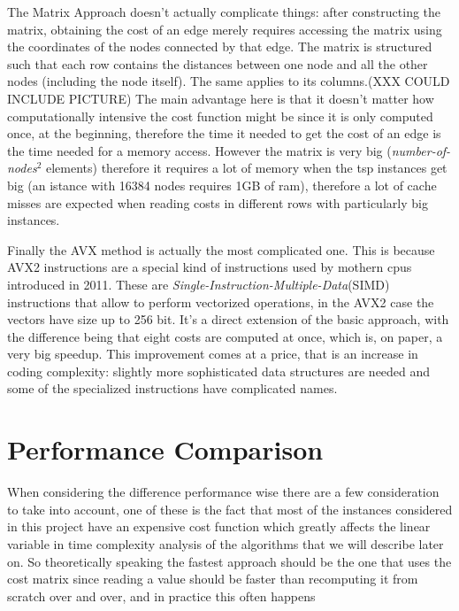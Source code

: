 The Matrix Approach doesn't actually complicate things: after constructing the matrix, obtaining the cost of an edge merely requires accessing the matrix using the coordinates of the nodes connected by that edge. The matrix is structured such that each row contains the distances between one node and all the other nodes (including the node itself). The same applies to its columns.(XXX COULD INCLUDE PICTURE) The main advantage here is that it doesn't matter how computationally intensive the cost function might be since it is only computed once, at the beginning, therefore the time it needed to get the cost of an edge is the time needed for a memory access. However the matrix is very big (\textit{number-of-nodes}$^2$ elements) therefore it requires a lot of memory when the tsp instances get big (an istance with 16384 nodes requires 1GB of ram), therefore a lot of cache misses are expected when reading costs in different rows with particularly big instances.

Finally the AVX method is actually the most complicated one. This is because AVX2 instructions are a special kind of instructions used by mothern cpus introduced in 2011\cite{avxWikipedia}. These are \textit{Single-Instruction-Multiple-Data}(SIMD) instructions that allow to perform vectorized operations, in the AVX2 case the vectors have size up to 256 bit\cite{avxWikipedia}. It's a direct extension of the basic approach, with the difference being that eight costs are computed at once, which is, on paper, a very big speedup. This improvement comes at a price, that is an increase in coding complexity: slightly more sophisticated data structures are needed and some of the specialized instructions have complicated names.

\section{Performance Comparison}

When considering the difference performance wise there are a few consideration to take into account, one of these is the fact that most of the instances considered in this project have an expensive cost function which greatly affects the linear variable in time complexity analysis of the algorithms that we will describe later on. So theoretically speaking the fastest approach should be the one that uses the cost matrix since reading a value should be faster than recomputing it from scratch over and over, and in practice this often happens
